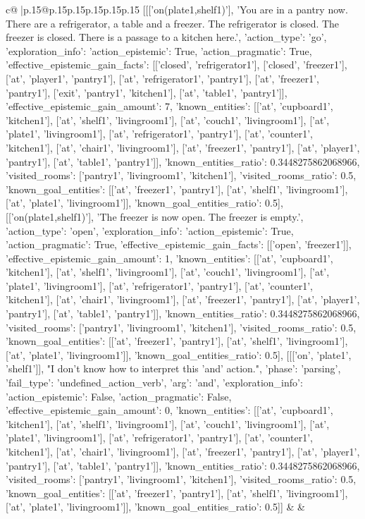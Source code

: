 \documentclass{article}
\begin{document}
{\begin{supertabular}{c@{$\;$}|p{.15\linewidth}@{}p{.15\linewidth}p{.15\linewidth}p{.15\linewidth}p{.15\linewidth}p{.15\linewidth}}
{{{	 [[['on(plate1,shelf1)'], 'You are in a pantry now. There are a refrigerator, a table and a freezer. The refrigerator is closed. The freezer is closed. There is a passage to a kitchen here.', {'action_type': 'go', 'exploration_info': {'action_epistemic': True, 'action_pragmatic': True, 'effective_epistemic_gain_facts': [['closed', 'refrigerator1'], ['closed', 'freezer1'], ['at', 'player1', 'pantry1'], ['at', 'refrigerator1', 'pantry1'], ['at', 'freezer1', 'pantry1'], ['exit', 'pantry1', 'kitchen1'], ['at', 'table1', 'pantry1']], 'effective_epistemic_gain_amount': 7, 'known_entities': [['at', 'cupboard1', 'kitchen1'], ['at', 'shelf1', 'livingroom1'], ['at', 'couch1', 'livingroom1'], ['at', 'plate1', 'livingroom1'], ['at', 'refrigerator1', 'pantry1'], ['at', 'counter1', 'kitchen1'], ['at', 'chair1', 'livingroom1'], ['at', 'freezer1', 'pantry1'], ['at', 'player1', 'pantry1'], ['at', 'table1', 'pantry1']], 'known_entities_ratio': 0.3448275862068966, 'visited_rooms': ['pantry1', 'livingroom1', 'kitchen1'], 'visited_rooms_ratio': 0.5, 'known_goal_entities': [['at', 'freezer1', 'pantry1'], ['at', 'shelf1', 'livingroom1'], ['at', 'plate1', 'livingroom1']], 'known_goal_entities_ratio': 0.5}}], [['on(plate1,shelf1)'], 'The freezer is now open. The freezer is empty.', {'action_type': 'open', 'exploration_info': {'action_epistemic': True, 'action_pragmatic': True, 'effective_epistemic_gain_facts': [['open', 'freezer1']], 'effective_epistemic_gain_amount': 1, 'known_entities': [['at', 'cupboard1', 'kitchen1'], ['at', 'shelf1', 'livingroom1'], ['at', 'couch1', 'livingroom1'], ['at', 'plate1', 'livingroom1'], ['at', 'refrigerator1', 'pantry1'], ['at', 'counter1', 'kitchen1'], ['at', 'chair1', 'livingroom1'], ['at', 'freezer1', 'pantry1'], ['at', 'player1', 'pantry1'], ['at', 'table1', 'pantry1']], 'known_entities_ratio': 0.3448275862068966, 'visited_rooms': ['pantry1', 'livingroom1', 'kitchen1'], 'visited_rooms_ratio': 0.5, 'known_goal_entities': [['at', 'freezer1', 'pantry1'], ['at', 'shelf1', 'livingroom1'], ['at', 'plate1', 'livingroom1']], 'known_goal_entities_ratio': 0.5}}], [[['on', 'plate1', 'shelf1']], "I don't know how to interpret this 'and' action.", {'phase': 'parsing', 'fail_type': 'undefined_action_verb', 'arg': 'and', 'exploration_info': {'action_epistemic': False, 'action_pragmatic': False, 'effective_epistemic_gain_amount': 0, 'known_entities': [['at', 'cupboard1', 'kitchen1'], ['at', 'shelf1', 'livingroom1'], ['at', 'couch1', 'livingroom1'], ['at', 'plate1', 'livingroom1'], ['at', 'refrigerator1', 'pantry1'], ['at', 'counter1', 'kitchen1'], ['at', 'chair1', 'livingroom1'], ['at', 'freezer1', 'pantry1'], ['at', 'player1', 'pantry1'], ['at', 'table1', 'pantry1']], 'known_entities_ratio': 0.3448275862068966, 'visited_rooms': ['pantry1', 'livingroom1', 'kitchen1'], 'visited_rooms_ratio': 0.5, 'known_goal_entities': [['at', 'freezer1', 'pantry1'], ['at', 'shelf1', 'livingroom1'], ['at', 'plate1', 'livingroom1']], 'known_goal_entities_ratio': 0.5}}]] 
	  } 
	   } 
	   } 
	 & & \\ 
 


\end{supertabular}}
\end{document}
